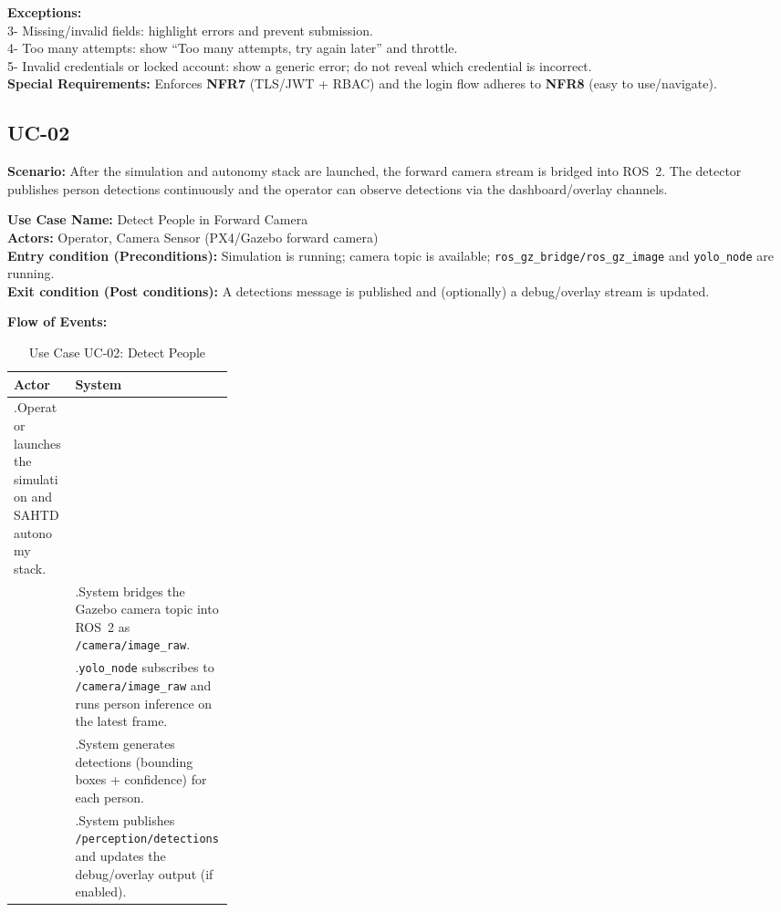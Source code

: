 \documentclass[12pt,a4paper]{report}
\begin{document}
\vspace{0.5em}
\noindent\textbf{Exceptions:}\\
3- Missing/invalid fields: highlight errors and prevent submission.\\
4- Too many attempts: show ``Too many attempts, try again later'' and throttle.\\
5- Invalid credentials or locked account: show a generic error; do not reveal which credential is incorrect.\\

\noindent\textbf{Special Requirements:} Enforces \textbf{NFR7} (TLS/JWT + RBAC) and the login flow adheres to \textbf{NFR8} (easy to use/navigate).

\subsection*{UC-02}

\vspace{0.5em}
\noindent\textbf{Scenario:} After the simulation and autonomy stack are launched, the forward camera stream is bridged into ROS~2. The detector publishes person detections continuously and the operator can observe detections via the dashboard/overlay channels.

\noindent\textbf{Use Case Name:} Detect People in Forward Camera\\
\textbf{Actors:} Operator, Camera Sensor (PX4/Gazebo forward camera)\\
\textbf{Entry condition (Preconditions):} Simulation is running; camera topic is available; \texttt{ros\_gz\_bridge/ros\_gz\_image} and \texttt{yolo\_node} are running.\\
\textbf{Exit condition (Post conditions):} A detections message is published and (optionally) a debug/overlay stream is updated.

\noindent\textbf{Flow of Events:}
\begin{table}[H]
\centering
\caption{Use Case UC-02: Detect People}
\label{tab:uc02_detect}
\begin{tabularx}{\linewidth}{|>{\raggedright\arraybackslash}p{0.28\linewidth}|>{\raggedright\arraybackslash}X|}
\hline
\textbf{Actor} & \textbf{System} \\
\hline
1.\;Operator launches the simulation and SAHTD autonomy stack. & \\ \hline
 & 2.\;System bridges the Gazebo camera topic into ROS~2 as \texttt{/camera/image\_raw}. \\ \hline
 & 3.\;\texttt{yolo\_node} subscribes to \texttt{/camera/image\_raw} and runs person inference on the latest frame. \\ \hline
 & 4.\;System generates detections (bounding boxes + confidence) for each person. \\ \hline
 & 5.\;System publishes \texttt{/perception/detections} and updates the debug/overlay output (if enabled). \\ \hline
\end{tabularx}
\end{table}
\end{document}
